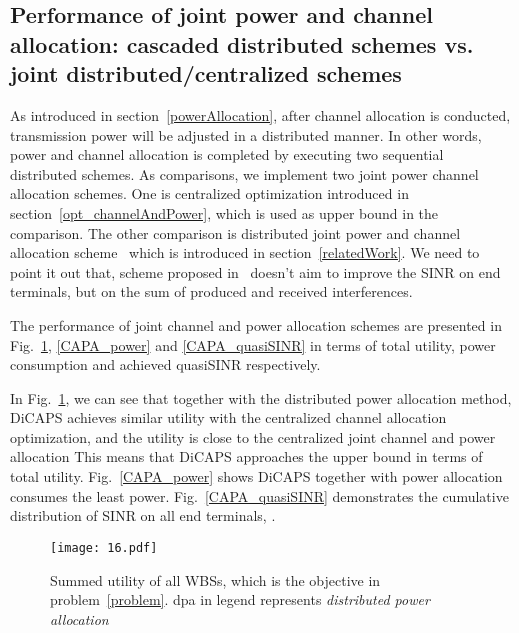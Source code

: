 \subsection{Performance of joint power and channel allocation: cascaded distributed schemes vs. joint distributed/centralized schemes}
As introduced in section~\ref{powerAllocation}, after channel allocation is conducted, transmission power will be adjusted in a distributed manner. 
In other words, power and channel allocation is completed by executing two sequential distributed schemes.
As comparisons, we implement two joint power channel allocation schemes.
One is centralized optimization introduced in section~\ref{opt_channelAndPower}, which is used as upper bound in the comparison.
The other comparison is distributed joint power and channel allocation scheme~\cite{pimrc_2012} which is introduced in section~\ref{relatedWork}.
We need to point it out that, scheme proposed in~\cite{pimrc_2012} doesn't aim to improve the SINR on end terminals, but on the sum of produced and received interferences.

The performance of joint channel and power allocation schemes are presented in Fig.~\ref{CAPA_utility}, \ref{CAPA_power} and \ref{CAPA_quasiSINR} in terms of total utility, power consumption and achieved quasiSINR respectively.

In Fig.~\ref{CAPA_utility}, we can see that together with the distributed power allocation method, DiCAPS achieves similar utility with the centralized channel allocation optimization, and the utility is close to the centralized joint channel and power allocation
This means that DiCAPS approaches the upper bound in terms of total utility.
Fig.~\ref{CAPA_power} shows DiCAPS together with power allocation consumes the least power.
Fig.~\ref{CAPA_quasiSINR} demonstrates the cumulative distribution of SINR on all end terminals,
.

\begin{figure}[h!]
  \centering
  \texttt{[image: 16.pdf]}
  \caption{Summed utility of all WBSs, which is the objective in problem~\ref{problem}. dpa in legend represents \textit{distributed power allocation}}
\label{CAPA_utility}
\end{figure}





